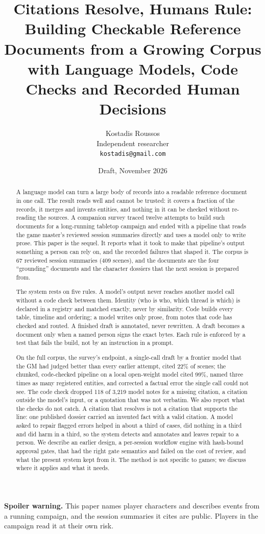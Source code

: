 \documentclass[11pt]{article}
\title{Citations Resolve, Humans Rule:\\
Building Checkable Reference Documents from a Growing Corpus\\
with Language Models, Code Checks and Recorded Human Decisions}
\author{Kostadis Roussos\\Independent researcher\\\texttt{kostadis@gmail.com}}
\date{Draft, November 2026}
\begin{document}
\maketitle

\noindent\textbf{Spoiler warning.} This paper names player characters and describes
events from a running campaign, and the session summaries it cites are public. Players
in the campaign read it at their own risk.

\begin{abstract}
A language model can turn a large body of records into a readable reference document in
one call. The result reads well and cannot be trusted: it covers a fraction of the
records, it merges and invents entities, and nothing in it can be checked without
re-reading the sources. A companion survey traced twelve attempts to build such
documents for a long-running tabletop campaign and ended with a pipeline that reads the
game master's reviewed session summaries directly and uses a model only to write prose.
This paper is the sequel. It reports what it took to make that pipeline's output
something a person can rely on, and the recorded failures that shaped it. The corpus is
67 reviewed session summaries (409 scenes), and the documents are the four ``grounding''
documents and the character dossiers that the next session is prepared from.

The system rests on five rules. A model's output never reaches another model call
without a code check between them. Identity (who is who, which thread is which) is
declared in a registry and matched exactly, never by similarity. Code builds every
table, timeline and ordering; a model writes only prose, from notes that code has
checked and routed. A finished draft is annotated, never rewritten. A draft becomes a
document only when a named person signs the exact bytes. Each rule is enforced by a
test that fails the build, not by an instruction in a prompt.

On the full corpus, the survey's endpoint, a single-call draft by a frontier model that
the GM had judged better than every earlier attempt, cited 22\% of scenes; the
chunked, code-checked pipeline on a local open-weight model cited 99\%, named three
times as many registered entities, and corrected a factual error the single call could
not see. The code check dropped 118 of 3{,}219 model notes for a missing citation, a
citation outside the model's input, or a quotation that was not verbatim. We also report
what the checks do not catch. A citation that resolves is not a citation that supports
the line: one published dossier carried an invented fact with a valid citation. A model
asked to repair flagged errors helped in about a third of cases, did nothing in a third
and did harm in a third, so the system detects and annotates and leaves repair to a
person. We describe an earlier design, a per-session workflow engine with hash-bound
approval gates, that had the right gate semantics and failed on the cost of review, and
what the present system kept from it. The method is not specific to games; we discuss
where it applies and what it needs.
\end{abstract}
\end{document}
